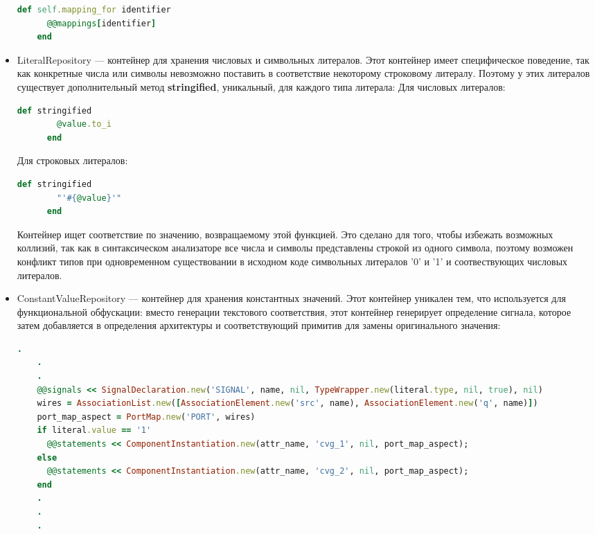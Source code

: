 \begin{itemize}
\begin{lstlisting}[language=Ruby, style=rubystyle,caption={Вспомогательные методы контейнера}, label=lst:arch_and_mod:support_methods]
    def self.mapping_for identifier
      @@mappings[identifier]
    end
  \end{lstlisting}
  \item
  LiteralRepository --- контейнер для хранения числовых и символьных литералов. Этот контейнер имеет специфическое поведение, так как конкретные числа или символы невозможно поставить в соответствие некоторому строковому литералу. Поэтому у этих литералов существует дополнительный метод \textbf{stringified}, уникальный, для каждого типа литерала:
  \subitem Для числовых литералов:
    \begin{lstlisting}[language=Ruby, style=rubystyle,caption={Вспомогательные метод stringified для числовых литералов}, label=lst:arch_and_mod:decimal_stringified]
      def stringified
        @value.to_i
      end
    \end{lstlisting}
  \subitem Для строковых литералов:
     \begin{lstlisting}[language=Ruby, style=rubystyle,caption={Вспомогательные метод stringified для символьных литералов}, label=lst:arch_and_mod:character_stringified]
      def stringified
        "'#{@value}'"
      end
    \end{lstlisting}
  Контейнер ищет соответствие по значению, возвращаемому этой функцией. Это сделано для того, чтобы избежать возможных коллизий, так как в синтаксическом анализаторе все числа и символы представлены строкой из одного символа, поэтому возможен конфликт типов при одновременном существовании в исходном коде символьных литералов '0' и '1' и соотвествующих числовых литералов.
  \item
  ConstantValueRepository --- контейнер для хранения константных значений. Этот контейнер уникален тем, что используется для функциональной обфускации: вместо генерации текстового соответствия, этот контейнер генерирует определение сигнала, которое затем добавляется в определения архитектуры и соответствующий примитив для замены оригинального значения:
  \begin{lstlisting}[language=Ruby, style=rubystyle,caption={Создание сигнала на основе значения константы}, label=lst:arch_and_mod:constant_generate_name]
    .
    .
    .
    @@signals << SignalDeclaration.new('SIGNAL', name, nil, TypeWrapper.new(literal.type, nil, true), nil)
    wires = AssociationList.new([AssociationElement.new('src', name), AssociationElement.new('q', name)])
    port_map_aspect = PortMap.new('PORT', wires)
    if literal.value == '1'
      @@statements << ComponentInstantiation.new(attr_name, 'cvg_1', nil, port_map_aspect);
    else
      @@statements << ComponentInstantiation.new(attr_name, 'cvg_2', nil, port_map_aspect);
    end
    .
    .
    .
  \end{lstlisting}
  \end{itemize}

